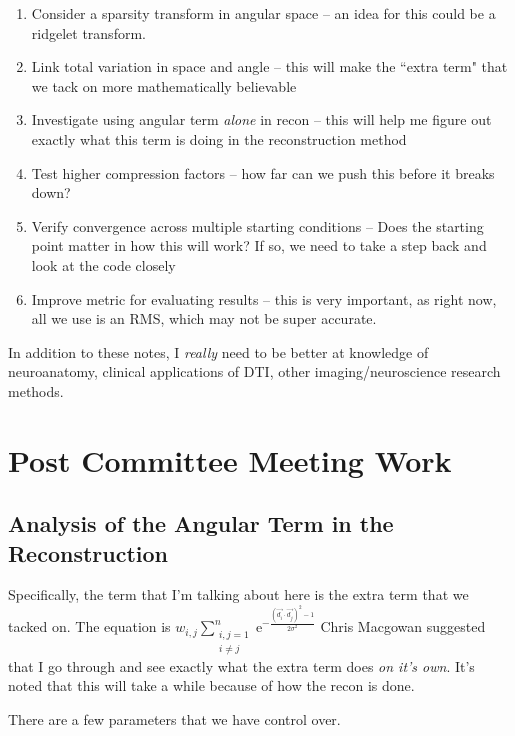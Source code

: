 \documentclass[11 pt]{article}
\newcommand{\me}{\mathrm{e}}
\let\oldsection\section
\renewcommand\section{\clearpage\newpage\oldsection}
\begin{document}
  \begin{enumerate}
    \item Consider a sparsity transform in angular space -- an idea for this could be a ridgelet transform.

    \item Link total variation in space and angle -- this will make the ``extra term" that we tack on more mathematically believable

    \item Investigate using angular term \emph{alone} in recon -- this will help me figure out exactly what this term is doing in the reconstruction method

    \item Test higher compression factors -- how far can we push this before it breaks down?

    \item Verify convergence across multiple starting conditions -- Does the starting point matter in how this will work? If so, we need to take a step back and look at the code closely

    \item Improve metric for evaluating results -- this is very important, as right now, all we use is an RMS, which may not be super accurate.
    \end{enumerate}
  
  In addition to these notes, I \emph{really} need to be better at knowledge of neuroanatomy, clinical applications of DTI, other imaging/neuroscience research methods.


\section{Post Committee Meeting Work}

  \subsection{Analysis of the Angular Term in the Reconstruction}
    Specifically, the term that I'm talking about here is the extra term that we tacked on. The equation is $w_{i,j} \sum\limits_{\substack{i,j = 1 \\ i \neq j}}^n  \me^{{-\frac{(\vec{d_i}\cdot\vec{d_j})^2 - 1}{2\sigma^2}}}$ Chris Macgowan suggested that I go through and see exactly what the extra term does \emph{on it's own}. It's noted that this will take a while because of how the recon is done.

    There are a few parameters that we have control over.
\end{document}
